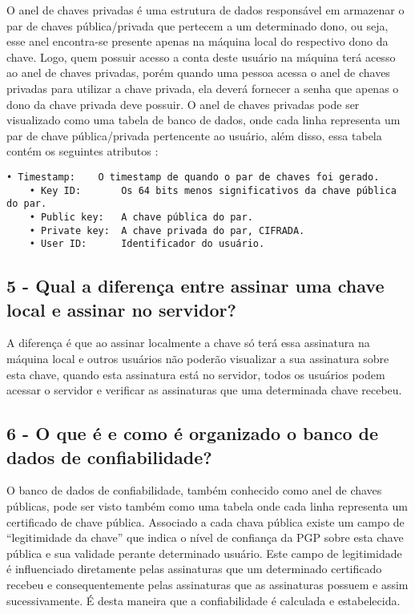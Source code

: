 \documentclass[
    article,            %
    11pt,               %
    oneside,            %
    a4paper,            %
    english,            %
    brazil,             %
    sumario=tradicional,
    ]{abntex2}
\begin{document}
O anel de chaves privadas é uma estrutura de dados responsável em armazenar o par de chaves pública/privada que pertecem a um determinado dono, ou seja, esse anel encontra-se presente apenas na máquina local do respectivo dono da chave. Logo, quem possuir acesso a conta deste usuário na máquina terá acesso ao anel de chaves privadas, porém quando uma pessoa acessa o anel de chaves privadas para utilizar a chave privada, ela deverá fornecer a senha que apenas o dono da chave privada deve possuir.
O anel de chaves privadas pode ser visualizado como uma tabela de banco de dados, onde cada linha representa um par de chave pública/privada pertencente ao usuário, além disso, essa tabela contém os seguintes atributos \cite{Stallings:2010:CNS:1824151}: 
\begin{Verbatim}[commandchars=\\\{\}, fontsize=\footnotesize]
    • Timestamp:    O timestamp de quando o par de chaves foi gerado.
    • Key ID:       Os 64 bits menos significativos da chave pública do par.
    • Public key:   A chave pública do par.
    • Private key:  A chave privada do par, CIFRADA.
    • User ID:      Identificador do usuário.
\end{Verbatim}


\subsection*{\textbf{5 - Qual a diferença entre assinar uma chave local e assinar no servidor?}}

A diferença é que ao assinar localmente a chave só terá essa assinatura na máquina local e outros usuários não poderão visualizar a sua assinatura sobre esta chave, quando esta assinatura está no servidor, todos os usuários podem acessar o servidor e verificar as assinaturas que uma determinada chave recebeu.

\subsection*{\textbf{6 - O que é e como é organizado o banco de dados de confiabilidade?}}

O banco de dados de confiabilidade, também conhecido como anel de chaves públicas, pode ser visto também como uma tabela onde cada linha representa um certificado de chave pública. Associado a cada chava pública existe um campo de ``legitimidade da chave'' que indica o nível de confiança da PGP sobre esta chave pública e sua validade perante determinado usuário. Este campo de legitimidade é influenciado diretamente pelas assinaturas que um determinado certificado recebeu e consequentemente pelas assinaturas que as assinaturas possuem e assim sucessivamente. É desta maneira que a confiabilidade é calculada e estabelecida. 
\end{document}
